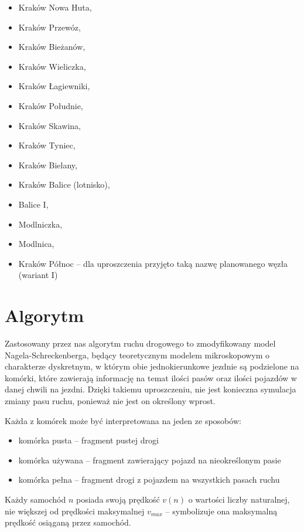 \documentclass[a4paper,12pt]{article}
\begin{document}
	\begin{itemize}
		\item Kraków Nowa Huta,
		\item Kraków Przewóz,
		\item Kraków Bieżanów,
		\item Kraków Wieliczka,
		\item Kraków Łagiewniki,
		\item Kraków Południe,
		\item Kraków Skawina,
		\item Kraków Tyniec,
		\item Kraków Bielany,
		\item Kraków Balice (lotnisko),
		\item Balice I,
		\item Modlniczka,
		\item Modlnica,
		\item Kraków Północ -- dla uproszczenia przyjęto taką nazwę planowanego węzła (wariant I)
	\end{itemize}

    \section{Algorytm}
    Zastosowany przez nas algorytm ruchu drogowego to zmodyfikowany model Nagela-Schreckenberga, będący teoretycznym modelem mikroskopowym o charakterze dyskretnym, w którym obie jednokierunkowe jezdnie są podzielone na komórki, które zawierają informację na temat ilości pasów oraz ilości pojazdów w danej chwili na jezdni. Dzięki takiemu uproszczeniu, nie jest konieczna symulacja zmiany pasu ruchu, ponieważ nie jest on określony wprost.
    
    Każda z komórek może być interpretowana na jeden ze sposobów:
    
    \begin{itemize}
    	\item komórka pusta -- fragment pustej drogi
    	\item komórka używana -- fragment zawierający pojazd na nieokreślonym pasie
    	\item komórka pełna -- fragment drogi z pojazdem na wszystkich pasach ruchu
    \end{itemize}

	Każdy samochód $n$ posiada swoją prędkość $v(n)$ o wartości liczby naturalnej, nie większej od prędkości maksymalnej $v_{max}$ -- symbolizuje ona maksymalną prędkość osiąganą przez samochód.
	
\end{document}
